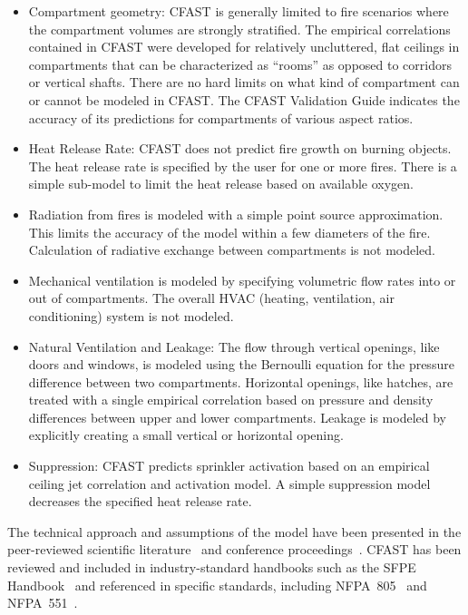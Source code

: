 \documentclass[12pt]{book}
\begin{document}
\begin{itemize}
\item Compartment geometry: CFAST is generally limited to fire scenarios where the compartment volumes are strongly stratified. The empirical correlations contained in CFAST were developed for relatively uncluttered, flat ceilings in compartments that can be characterized as ``rooms'' as opposed to corridors or vertical shafts. There are no hard limits on what kind of compartment can or cannot be modeled in CFAST. The CFAST Validation Guide indicates the accuracy of its predictions for compartments of various aspect ratios.
\item Heat Release Rate: CFAST does not predict fire growth on burning objects. The heat release rate is specified by the user for one or more fires. There is a simple sub-model to limit the heat release based on available oxygen.
\item Radiation from fires is modeled with a simple point source approximation.  This limits the accuracy of the model within a few diameters of the fire. Calculation of radiative exchange between compartments is not modeled.
\item Mechanical ventilation is modeled by specifying volumetric flow rates into or out of compartments. The overall HVAC (heating, ventilation, air conditioning) system is not modeled.
\item Natural Ventilation and Leakage: The flow through vertical openings, like doors and windows, is modeled using the Bernoulli equation for the pressure difference between two compartments. Horizontal openings, like hatches, are treated with a single empirical correlation based on pressure and density differences between upper and lower compartments. Leakage is modeled by explicitly creating a small vertical or horizontal opening.
\item Suppression: CFAST predicts sprinkler activation based on an empirical ceiling jet correlation and activation model. A simple suppression model decreases the specified heat release rate.
\end{itemize}
The technical approach and assumptions of the model have been presented in the peer-reviewed scientific literature~\cite{Jones:1993a, Jones:1985, Jones:1984} and conference proceedings~\cite{Jones:1991}. CFAST has been reviewed and included in industry-standard handbooks such as the SFPE Handbook~\cite{Walton:2003} and referenced in specific standards, including NFPA~805~\cite{NFPA805:2004} and NFPA~551~\cite{NFPA551:2004}.
\end{document}
